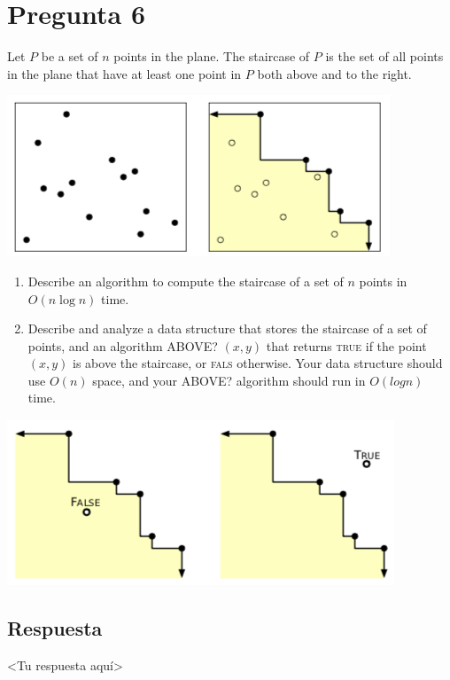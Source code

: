 \section*{Pregunta 6}
\noindent Let $P$ be a set of $n$ points in the plane. The staircase of $P$ is the set of all points in the plane that have at least one point in $P$ both above and to the right.
\begin{center}
    \includegraphics[scale=0.5]{escalera1}
\end{center}

\begin{enumerate}
    \item Describe an algorithm to compute the staircase of a set of $n$ points in $O(n \log n)$ time.
    
    \item Describe and analyze a data structure that stores the staircase of a set of points, and an algorithm ABOVE? $(x, y)$ that returns \textsc{true} if the point $(x, y)$ is above the staircase, or \textsc{fals} otherwise. Your data structure should use $O(n)$ space, and your ABOVE? algorithm should run in $O(log n)$ time.
\end{enumerate}

\begin{center}
    \includegraphics[scale=0.5]{escalera2}
\end{center}

\subsection*{Respuesta}

<Tu respuesta aquí>
 
\bigskip
